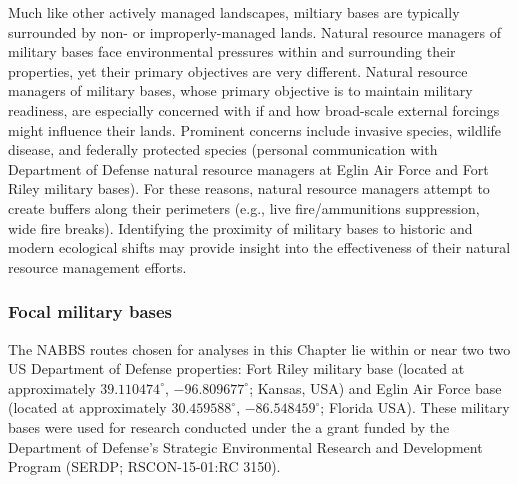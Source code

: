 \documentclass[12pt,twoside,openany]{reedthesis}
\begin{document}
Much like other actively managed landscapes, miltiary bases are
typically surrounded by non- or improperly-managed lands. Natural
resource managers of military bases face environmental pressures within
and surrounding their properties, yet their primary objectives are very
different. Natural resource managers of military bases, whose primary
objective is to maintain military readiness, are especially concerned
with if and how broad-scale external forcings might influence their
lands. Prominent concerns include invasive species, wildlife disease,
and federally protected species (personal communication with Department
of Defense natural resource managers at Eglin Air Force and Fort Riley
military bases). For these reasons, natural resource managers attempt to
create buffers along their perimeters (e.g., live fire/ammunitions
suppression, wide fire breaks). Identifying the proximity of military
bases to historic and modern ecological shifts may provide insight into
the effectiveness of their natural resource management efforts.

\subsubsection{Focal military bases}\label{focal-military-bases}

The NABBS routes chosen for analyses in this Chapter lie within or near
two two US Department of Defense properties: Fort Riley military base
(located at approximately \(39.110474^{\circ}\), \(-96.809677^{\circ}\);
Kansas, USA) and Eglin Air Force base (located at approximately
\(30.459588^{\circ}\), \(-86.548459^{\circ}\); Florida USA). These
military bases were used for research conducted under the a grant funded
by the Department of Defense's Strategic Environmental Research and
Development Program (SERDP; RSCON-15-01:RC 3150).
\end{document}
